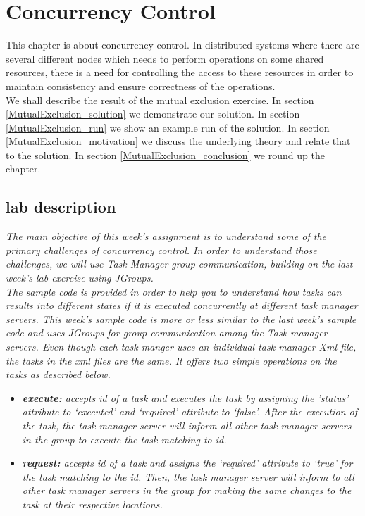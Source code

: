 \chapter{Concurrency Control}
\minitoc

This chapter is about concurrency control. In distributed systems where there are several different nodes which needs to perform operations on some shared resources, there is a need for controlling the access to these resources in order to maintain consistency and ensure correctness of the operations. \\

We shall describe the result of the mutual exclusion exercise. In section \ref{MutualExclusion_solution} we demonstrate our solution. In section \ref{MutualExclusion_run} we show an example run of the solution. In section \ref{MutualExclusion_motivation} we discuss the underlying theory and relate that to the solution. In section \ref{MutualExclusion_conclusion} we round up the chapter.

\section{lab description}
\textit{The main objective of this week's assignment is to understand some of the primary challenges of concurrency control. In order to understand those challenges, we will use Task Manager group communication, building on the last week's lab exercise using JGroups.}\\

\textit{The sample code is provided in order to help you to understand how tasks can results into different states if it is executed concurrently at different task manager servers. This week's sample code is more or less similar to the last week's sample code and uses JGroups for group communication among the Task manager servers. Even though each task manger uses an individual task manager Xml file, the tasks in the xml files are the same. It offers two simple operations on the tasks as described below.}

\begin{itemize}
\item \textit{\textbf{execute:} accepts id of a task and executes the task by assigning the ’status’ attribute to ‘executed’ and ‘required’ attribute to ‘false’. After the execution of the task, the task manager server will inform all other task manager servers in the group to execute the task matching to id.}
\item \textit{\textbf{request:} accepts id of a task and assigns the ‘required’ attribute to ‘true’ for the task matching to the id. Then, the task manager server will inform to all other task manager servers in the group for making the same changes to the task at their respective locations.}
\end{itemize}

